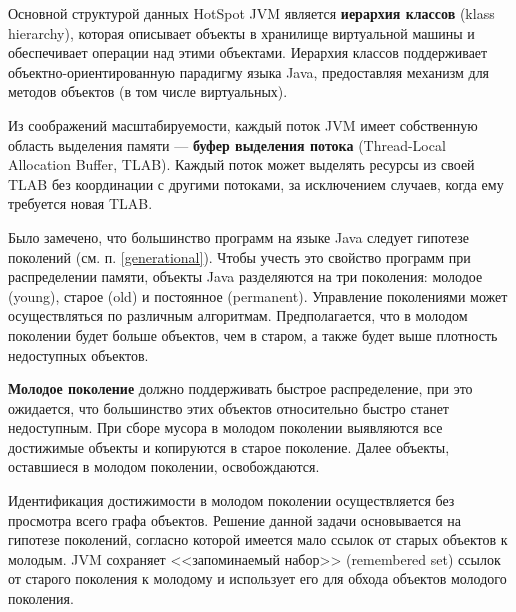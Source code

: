 Основной структурой данных HotSpot JVM является \textbf{иерархия классов} (klass hierarchy), которая описывает объекты в хранилище виртуальной машины и обеспечивает операции над этими объектами. Иерархия классов поддерживает объектно-ориентированную парадигму языка Java, предоставляя механизм для методов объектов (в том числе виртуальных). \cite{java_storage_management}

Из соображений масштабируемости, каждый поток JVM имеет собственную область выделения памяти --- \textbf{буфер выделения потока} (Thread-Local Allocation Buffer, TLAB). Каждый поток может выделять ресурсы из своей TLAB без координации с другими потоками, за исключением случаев, когда ему требуется новая TLAB. \cite{java_storage_management}

Было замечено, что большинство программ на языке Java следует гипотезе поколений (см. п. \ref{generational}). Чтобы учесть это свойство программ при распределении памяти, объекты Java разделяются на три поколения: молодое (young), старое (old) и постоянное (permanent). Управление поколениями может осуществляться по различным алгоритмам. Предполагается, что в молодом поколении будет больше объектов, чем в старом, а также будет выше плотность недоступных объектов. \cite{java_storage_management}

\textbf{Молодое поколение} должно поддерживать быстрое распределение, при это ожидается, что большинство этих объектов относительно быстро станет недоступным. При сборе мусора в молодом поколении выявляются все достижимые объекты и копируются в старое поколение. Далее объекты, оставшиеся в молодом поколении, освобождаются. \cite{java_storage_management}

Идентификация достижимости в молодом поколении осуществляется без просмотра всего графа объектов. Решение данной задачи основывается на гипотезе поколений, согласно которой имеется мало ссылок от старых объектов к молодым. JVM сохраняет <<запоминаемый набор>> (remembered set) ссылок от старого поколения к молодому и использует его для обхода объектов молодого поколения. \cite{java_storage_management}

